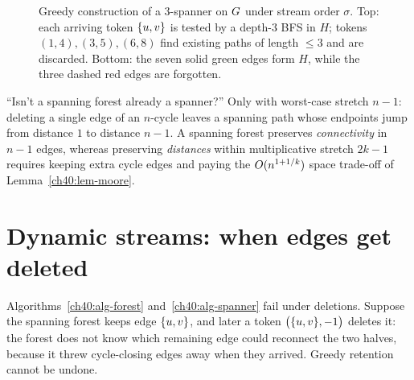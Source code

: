 \begin{figure}[htbp]
\caption{Greedy construction of a $3$-spanner on $G$ under stream order $\sigma$. Top: each arriving token $\{u,v\}$ is tested by a depth-$3$ BFS in $H$; tokens $(1,4),(3,5),(6,8)$ find existing paths of length $\le 3$ and are discarded. Bottom: the seven solid green edges form $H$, while the three dashed red edges are forgotten.}
\label{ch40:fig-spanner}
\end{figure}

\begin{trapbox}
``Isn't a spanning forest already a spanner?'' Only with worst-case stretch $n-1$:
deleting a single edge of an $n$-cycle leaves a spanning path whose endpoints
jump from distance $1$ to distance $n-1$. A spanning forest preserves
\emph{connectivity} in $n-1$ edges, whereas preserving \emph{distances} within
multiplicative stretch $2k-1$ requires keeping extra cycle edges and paying the
$O(n^{1+1/k})$ space trade-off of Lemma~\ref{ch40:lem-moore}.
\end{trapbox}

\section{Dynamic streams: when edges get deleted}
\label{ch40:sketching}

Algorithms~\ref{ch40:alg-forest} and~\ref{ch40:alg-spanner} fail
under deletions. Suppose the spanning forest keeps edge $\{u,v\}$, and later a
token $\bigl(\{u,v\},-1\bigr)$ deletes it: the forest does not know
which remaining edge could reconnect the two halves, because it threw
cycle-closing edges away when they arrived. Greedy retention cannot be undone.

